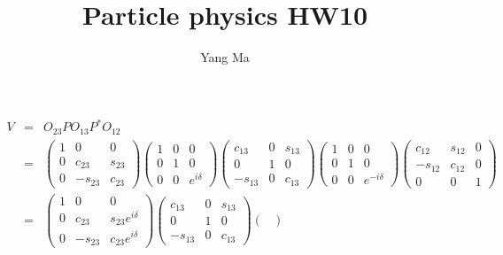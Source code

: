 \documentclass[11pt]{article}
\begin{document}
\title{Particle physics HW10}
\author{Yang Ma}

\maketitle

\section{ }
\begin{eqnarray}
    V &=& O_{23} P O_{13} P^* O_{12} \\
    &=&
    \begin{pmatrix}
        1 & 0& 0 \\
        0 &c_{23}&s_{23}\\
        0& -s_{23}&c_{23}
    \end{pmatrix}
    \begin{pmatrix}
        1 & 0 & 0 \\ 
        0 & 1 & 0 \\ 
        0 & 0 & e^{i\delta} 
    \end{pmatrix}
    \begin{pmatrix}
        c_{13} & 0& s_{13} \\
        0 &1&0\\
        -s_{13}& 0&c_{13}
    \end{pmatrix}
    \begin{pmatrix}
        1 & 0 & 0 \\ 
        0 & 1 & 0 \\ 
        0 & 0 & e^{-i\delta} 
    \end{pmatrix}
    \begin{pmatrix}
        c_{12} & s_{12}& 0 \\
        -s_{12} &c_{12}&0\\
        0& 0&1
    \end{pmatrix}\\
    &=&
    \begin{pmatrix}
        1 & 0& 0 \\
        0 &c_{23}&s_{23}e^{i\delta}\\
        0& -s_{23}&c_{23}e^{i\delta}
    \end{pmatrix}
    \begin{pmatrix}
        c_{13} & 0& s_{13} \\
        0 &1&0\\
        -s_{13}& 0&c_{13}
    \end{pmatrix}
    \begin{pmatrix}

\end{pmatrix}
\end{eqnarray}
\end{document}
